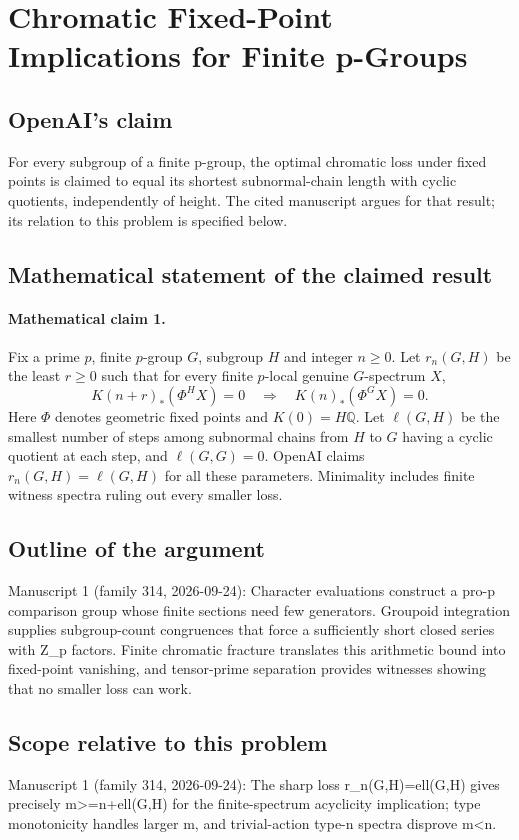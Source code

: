 \documentclass[11pt]{article}
\begin{document}
\section*{Chromatic Fixed-Point Implications for Finite p-Groups}

\subsection{OpenAI's claim}
For every subgroup of a finite p-group, the optimal chromatic loss under fixed points is claimed to equal its shortest subnormal-chain length with cyclic quotients, independently of height. The cited manuscript argues for that result; its relation to this problem is specified below.

\subsection{Mathematical statement of the claimed result}
\paragraph{Mathematical claim 1.} Fix a prime $p$, finite $p$-group $G$, subgroup $H$ and integer $n\ge0$. Let $r_n(G,H)$ be the least $r\ge0$ such that for every finite $p$-local genuine $G$-spectrum $X$,
\[
K(n+r)_*(\Phi^HX)=0\quad\Longrightarrow\quad K(n)_*(\Phi^GX)=0.
\]
Here $\Phi$ denotes geometric fixed points and $K(0)=H\mathbb Q$. Let $\ell(G,H)$ be the smallest number of steps among subnormal chains from $H$ to $G$ having a cyclic quotient at each step, and $\ell(G,G)=0$. OpenAI claims $r_n(G,H)=\ell(G,H)$ for all these parameters. Minimality includes finite witness spectra ruling out every smaller loss.

\subsection{Outline of the argument}
Manuscript 1 (family 314, 2026-09-24): Character evaluations construct a pro-p comparison group whose finite sections need few generators. Groupoid integration supplies subgroup-count congruences that force a sufficiently short closed series with Z\_p factors. Finite chromatic fracture translates this arithmetic bound into fixed-point vanishing, and tensor-prime separation provides witnesses showing that no smaller loss can work.

\subsection{Scope relative to this problem}
Manuscript 1 (family 314, 2026-09-24): The sharp loss r\_n(G,H)=ell(G,H) gives precisely m>=n+ell(G,H) for the finite-spectrum acyclicity implication; type monotonicity handles larger m, and trivial-action type-n spectra disprove m<n.
\end{document}

